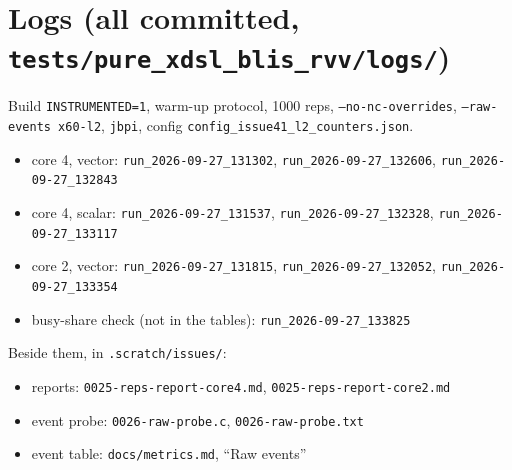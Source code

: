\documentclass[10pt,a4paper]{article}
\begin{document}
\section{Logs (all committed, \texttt{tests/pure\_xdsl\_blis\_rvv/logs/})}
Build \texttt{INSTRUMENTED=1}, warm-up protocol, 1000 reps, \texttt{--no-nc-overrides}, \texttt{--raw-events x60-l2},
\texttt{jbpi}, config \texttt{config\_issue41\_l2\_counters.json}.
\begin{itemize}
  \item core 4, vector: \texttt{run\_2026-09-27\_131302}, \texttt{run\_2026-09-27\_132606}, \texttt{run\_2026-09-27\_132843}
  \item core 4, scalar: \texttt{run\_2026-09-27\_131537}, \texttt{run\_2026-09-27\_132328}, \texttt{run\_2026-09-27\_133117}
  \item core 2, vector: \texttt{run\_2026-09-27\_131815}, \texttt{run\_2026-09-27\_132052}, \texttt{run\_2026-09-27\_133354}
  \item busy-share check (not in the tables): \texttt{run\_2026-09-27\_133825}
\end{itemize}
Beside them, in \texttt{.scratch/issues/}:
\begin{itemize}
  \item reports: \texttt{0025-reps-report-core4.md}, \texttt{0025-reps-report-core2.md}
  \item event probe: \texttt{0026-raw-probe.c}, \texttt{0026-raw-probe.txt}
  \item event table: \texttt{docs/metrics.md}, ``Raw events''
\end{itemize}
\end{document}
